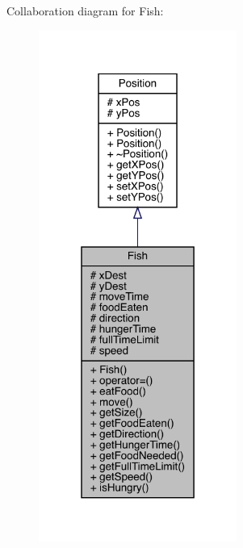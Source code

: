 Collaboration diagram for Fish\+:
\nopagebreak
\begin{figure}[H]
\begin{center}
\leavevmode
\includegraphics[width=184pt]{class_fish__coll__graph}
\end{center}
\end{figure}
